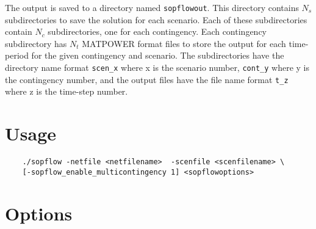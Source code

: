 The \sopflow output is saved to a directory named \texttt{sopflowout}. This
directory contains $N_s$ subdirectories to save the solution for each scenario.
Each of these subdirectories contain $N_c$ subdirectories, one for each
contingency. Each contingency subdirectory has $N_t$ MATPOWER format files to
store the output for each time-period for the given contingency and scenario.
The subdirectories have the directory name format \texttt{scen_x} where x is
the scenario number,  \texttt{cont_y} where y is the contingency number, and
the output files have the file name format \texttt{t_z} where z is the time-step number.

\section{Usage}
\begin{lstlisting}
    ./sopflow -netfile <netfilename>  -scenfile <scenfilename> \
    [-sopflow_enable_multicontingency 1] <sopflowoptions>
\end{lstlisting}

\section{Options}

